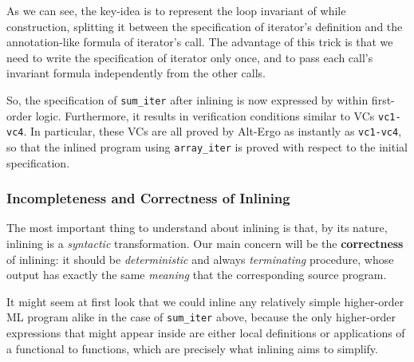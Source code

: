 \documentclass[a4paper,11pt,oneside]{article}
\theoremstyle{plain}
\begin{document}
As we can see, the key-idea is to represent the loop invariant of while construction, splitting it between the specification of iterator's definition and the annotation-like formula of iterator's call.
The advantage of this trick is that we need to write the specification of iterator only once, and to pass each call's invariant formula independently from the other calls.

	So, the specification of \texttt{sum\_iter} after inlining is now expressed by within first-order logic.
	Furthermore, it results in verification conditions similar to VCs \texttt{vc1-vc4}. 
	In particular, these VCs are all proved by Alt-Ergo as instantly as \texttt{vc1-vc4}, so that the inlined program using \texttt{array\_iter} is proved with respect to the initial specification.
 
 \subsubsection*{Incompleteness and Correctness of Inlining}
 
The most important thing to understand about inlining is that, by its
nature, inlining is a \textit{syntactic} transformation. 
Our main concern will be the \textbf{correctness} of inlining: it should be \textit{deterministic} and always \textit{terminating} procedure, whose output has exactly the same \textit{meaning} that the corresponding source program. 
 

It might seem at first look that we could inline any relatively simple higher-order ML program alike in the case of \texttt{sum\_iter} above, because the only higher-order expressions that might appear inside are either local definitions or applications of a functional to functions, which are precisely what inlining aims to simplify.	 
\end{document}
